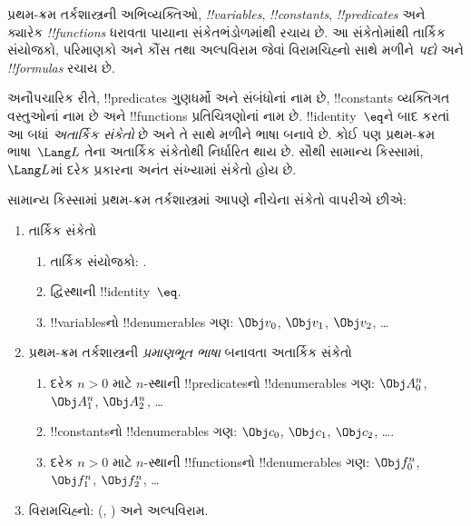 \documentclass[../../../include/open-logic-section]{subfiles}
\begin{document}



પ્રથમ-ક્રમ તર્કશાસ્ત્રની અભિવ્યક્તિઓ, \emph{!!{variable}s},
\emph{!!{constant}s}, \emph{!!{predicate}s} અને ક્યારેક
\emph{!!{function}s} ધરાવતા પાયાના સંકેતભંડોળમાંથી રચાય છે. આ
સંકેતોમાંથી તાર્કિક સંયોજકો, પરિમાણકો અને કૌંસ તથા અલ્પવિરામ જેવાં
વિરામચિહ્નો સાથે મળીને \emph{પદો} અને \emph{!!{formula}s} રચાય છે.

\begin{explain}
અનૌપચારિક રીતે, !!{predicate}s ગુણધર્મો અને સંબંધોનાં નામ છે,
!!{constant}s વ્યક્તિગત વસ્તુઓનાં નામ છે અને !!{function}s
પ્રતિચિત્રણોનાં નામ છે. !!{identity}~$\eq$ને બાદ કરતાં આ બધાં
\emph{અતાર્કિક સંકેતો} છે અને તે સાથે મળીને ભાષા બનાવે છે. કોઈ પણ
પ્રથમ-ક્રમ ભાષા~$\Lang L$ તેના અતાર્કિક સંકેતોથી નિર્ધારિત થાય છે.
સૌથી સામાન્ય કિસ્સામાં, $\Lang L$માં દરેક પ્રકારના અનંત સંખ્યામાં
સંકેતો હોય છે.
\end{explain}

સામાન્ય કિસ્સામાં પ્રથમ-ક્રમ તર્કશાસ્ત્રમાં આપણે નીચેના સંકેતો
વાપરીએ છીએ:

\begin{enumerate}
\item તાર્કિક સંકેતો
\begin{enumerate}
\item તાર્કિક સંયોજકો:
  \startycommalist
  .
\item દ્વિસ્થાની !!{identity}~$\eq$.
\item !!{variable}sનો !!{denumerable}s ગણ: $\Obj v_0$, $\Obj v_1$,
  $\Obj v_2$, \dots
\end{enumerate}
\item પ્રથમ-ક્રમ તર્કશાસ્ત્રની \emph{પ્રમાણભૂત ભાષા} બનાવતા
  અતાર્કિક સંકેતો
\begin{enumerate}
\item દરેક $n>0$ માટે $n$-સ્થાની !!{predicate}sનો !!{denumerable}s
  ગણ: $\Obj A^n_0$, $\Obj A^n_1$, $\Obj A^n_2$, \dots
\item !!{constant}sનો !!{denumerable}s ગણ: $\Obj c_0$, $\Obj c_1$,
  $\Obj c_2$, \dots.
\item દરેક $n>0$ માટે $n$-સ્થાની !!{function}sનો !!{denumerable}s
  ગણ: $\Obj f^n_0$, $\Obj f^n_1$, $\Obj f^n_2$, \dots
\end{enumerate}
\item વિરામચિહ્નો: (, ) અને અલ્પવિરામ.
\end{enumerate}
\end{document}

